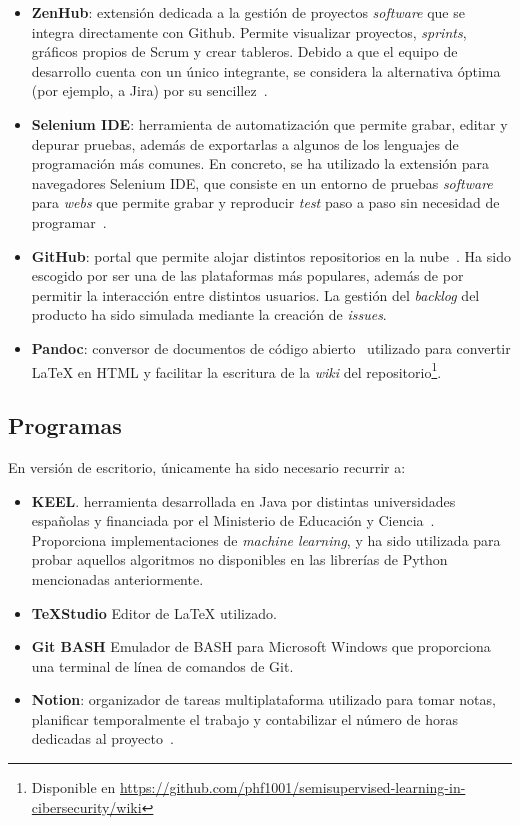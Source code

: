 \begin{itemize}
	\item \textbf{ZenHub}: extensión dedicada a la gestión de proyectos \textit{software} que se integra directamente con Github. Permite visualizar proyectos, \textit{sprints}, gráficos propios de Scrum y crear tableros. Debido a que el equipo de desarrollo cuenta con un único integrante, se considera la alternativa óptima (por ejemplo, a Jira) por su sencillez~\cite{zenhubHome}.
	
	\item \textbf{Selenium IDE}: herramienta de automatización que permite grabar, editar y depurar pruebas, además de exportarlas a algunos de los lenguajes de programación más comunes. En concreto, se ha utilizado la extensión para navegadores Selenium IDE, que consiste en un entorno de pruebas \textit{software} para \textit{webs} que permite grabar y reproducir \textit{test} paso a paso sin necesidad de programar~\cite{seleniumIDE}.
	
	\item \textbf{GitHub}: portal que permite alojar distintos repositorios en la nube~\cite{githubHome}. Ha sido escogido por ser una de las plataformas más populares, además de por permitir la interacción entre distintos usuarios. La gestión del \textit{backlog} del producto ha sido simulada mediante la creación de \textit{issues}.
	
	\item \textbf{Pandoc}: conversor de documentos de código abierto~\cite{pandoc} utilizado para convertir \LaTeX{} en HTML y facilitar la escritura de la \textit{wiki} del repositorio\footnote{Disponible en \url{https://github.com/phf1001/semisupervised-learning-in-cibersecurity/wiki}}.
\end{itemize}

\subsection{Programas}

En versión de escritorio, únicamente ha sido necesario recurrir a:

\begin{itemize}
	\item \textbf{KEEL}. herramienta desarrollada en Java por distintas universidades españolas y financiada por el Ministerio de Educación y Ciencia~\cite{keelRepo}. Proporciona implementaciones de \textit{machine learning}, y ha sido utilizada para probar aquellos algoritmos no disponibles en las librerías de Python mencionadas anteriormente.
	\item \textbf{\TeX{}Studio}
	Editor de \LaTeX{} utilizado.
	\item \textbf{Git BASH}
	Emulador de BASH para Microsoft Windows que proporciona una terminal de línea de comandos de Git.
	\item \textbf{Notion}: organizador de tareas multiplataforma utilizado para tomar notas, planificar temporalmente el trabajo y contabilizar el número de horas dedicadas al proyecto~\cite{notion}.
\end{itemize}


